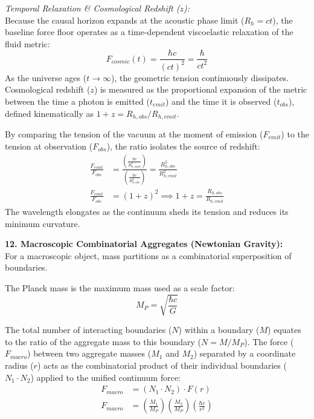 \vspace{0.2 cm}
\textit{Temporal Relaxation \& Cosmological Redshift ($z$):} \\
Because the causal horizon expands at the acoustic phase limit ($R_h = c t$), the baseline force floor operates as a time-dependent viscoelastic relaxation of the fluid metric:
\begin{equation}
    F_{cosmic}(t) = \frac{\hbar c}{(c t)^2} = \frac{\hbar}{c t^2}
\end{equation}
As the universe ages ($t \to \infty$), the geometric tension continuously dissipates. Cosmological redshift ($z$) is measured as the proportional expansion of the metric between the time a photon is emitted ($t_{emit}$) and the time it is observed ($t_{obs}$), defined kinematically as $1+z = R_{h,obs} / R_{h,emit}$. 

By comparing the tension of the vacuum at the moment of emission ($F_{emit}$) to the tension at observation ($F_{obs}$), the ratio isolates the source of redshift:
\begin{align}
    \frac{F_{emit}}{F_{obs}} &= \frac{\left( \frac{\hbar c}{R_{h,emit}^2} \right)}{\left( \frac{\hbar c}{R_{h,obs}^2} \right)} = \frac{R_{h,obs}^2}{R_{h,emit}^2} \nonumber \\
    \frac{F_{emit}}{F_{obs}} &= (1+z)^2 \implies 1+z = \frac{R_{h,obs}}{R_{h,emit}} \label{eq:redshift_tension}
\end{align}
The wavelength elongates as the continuum sheds its tension and reduces its minimum curvature.

\vspace{0.2 cm}

\textbf{12. Macroscopic Combinatorial Aggregates (Newtonian Gravity):} \\
For a macroscopic object, mass partitions as a combinatorial superposition of boundaries.

The Planck mass is the maximum mass used as a scale factor:
\begin{equation}
    M_P = \sqrt{\frac{\hbar c}{G}} 
\end{equation}

The total number of interacting boundaries ($N$) within a boundary ($M$) equates to the ratio of the aggregate mass to this boundary ($N = M / M_P$). The force ($F_{macro}$) between two aggregate masses ($M_1$ and $M_2$) separated by a coordinate radius ($r$) acts as the combinatorial product of their individual boundaries ($N_1 \cdot N_2$) applied to the unified continuum force:
\begin{align}
    F_{macro} &= (N_1 \cdot N_2) \cdot F(r) \nonumber \\
    F_{macro} &= \left( \frac{M_1}{M_P} \right) \left( \frac{M_2}{M_P} \right) \left( \frac{\hbar c}{r^2} \right)
\end{align}

